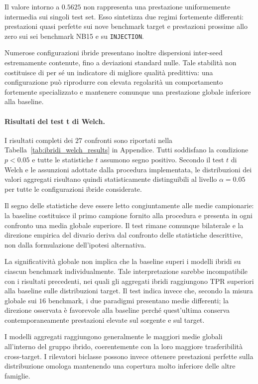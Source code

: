 Il valore intorno a $0.5625$ non rappresenta una prestazione uniformemente intermedia sui singoli test set. 
Esso sintetizza due regimi fortemente differenti: prestazioni quasi perfette sui nove benchmark target e prestazioni prossime allo zero sui sei benchmark NB15 e su \texttt{INJECTION}.

Numerose configurazioni ibride presentano inoltre dispersioni inter-seed estremamente contenute, fino a deviazioni standard nulle. 
Tale stabilità non costituisce di per sé un indicatore di migliore qualità predittiva: una configurazione può riprodurre con elevata regolarità un comportamento fortemente specializzato e mantenere comunque una prestazione globale inferiore alla baseline.

\paragraph{Risultati del test t di Welch.}
I risultati completi dei $27$ confronti sono riportati nella Tabella~\ref{tab:ibridi_welch_results} in Appendice. 
Tutti soddisfano la condizione $p<0.05$ e tutte le statistiche $t$ assumono segno positivo.
Secondo il test $t$ di Welch e le assunzioni adottate dalla procedura implementata, le distribuzioni dei valori aggregati risultano quindi statisticamente distinguibili al livello $\alpha=0.05$ per tutte le configurazioni ibride considerate.

Il segno delle statistiche deve essere letto congiuntamente alle medie campionarie: la baseline costituisce il primo campione fornito alla procedura e presenta in ogni confronto una media globale superiore. 
Il test rimane comunque bilaterale e la direzione empirica del divario deriva dal confronto delle statistiche descrittive, non dalla formulazione dell'ipotesi alternativa.

La significatività globale non implica che la baseline superi i modelli ibridi su ciascun benchmark individualmente. 
Tale interpretazione sarebbe incompatibile con i risultati precedenti, nei quali gli aggregati ibridi raggiungono TPR superiori alla baseline sulle distribuzioni target. 
Il test indica invece che, secondo la misura globale sui $16$ benchmark, i due paradigmi presentano medie differenti; la direzione osservata è favorevole alla baseline perché quest'ultima conserva contemporaneamente prestazioni elevate sul sorgente e sul target.

I modelli aggregati raggiungono generalmente le maggiori medie globali all'interno del gruppo ibrido, coerentemente con la loro maggiore trasferibilità cross-target. 
I rilevatori biclasse possono invece ottenere prestazioni perfette sulla distribuzione omologa mantenendo una copertura molto inferiore delle altre famiglie.

